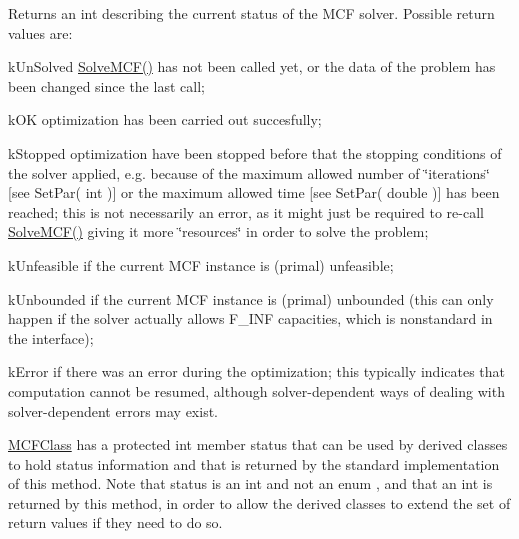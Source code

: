 Returns an int describing the current status of the M\+CF solver. Possible return values are\+:


\begin{DoxyItemize}
\item k\+Un\+Solved \mbox{\hyperlink{class_m_c_f_class_ac0d96429d896a2d878a5f057535ab1ee}{Solve\+M\+C\+F()}} has not been called yet, or the data of the problem has been changed since the last call;
\item k\+OK optimization has been carried out succesfully;
\item k\+Stopped optimization have been stopped before that the stopping conditions of the solver applied, e.\+g. because of the maximum allowed number of \char`\"{}iterations\char`\"{} \mbox{[}see Set\+Par( int )\mbox{]} or the maximum allowed time \mbox{[}see Set\+Par( double )\mbox{]} has been reached; this is not necessarily an error, as it might just be required to re-\/call \mbox{\hyperlink{class_m_c_f_class_ac0d96429d896a2d878a5f057535ab1ee}{Solve\+M\+C\+F()}} giving it more \char`\"{}resources\char`\"{} in order to solve the problem;
\item k\+Unfeasible if the current M\+CF instance is (primal) unfeasible;
\item k\+Unbounded if the current M\+CF instance is (primal) unbounded (this can only happen if the solver actually allows F\+\_\+\+I\+NF capacities, which is nonstandard in the interface);
\item k\+Error if there was an error during the optimization; this typically indicates that computation cannot be resumed, although solver-\/dependent ways of dealing with solver-\/dependent errors may exist.
\end{DoxyItemize}

\mbox{\hyperlink{class_m_c_f_class}{M\+C\+F\+Class}} has a protected {\ttfamily int} {\ttfamily member} {\ttfamily status} {\ttfamily that} can be used by derived classes to hold status information and that is returned by the standard implementation of this method. Note that {\ttfamily status} {\ttfamily is} an {\ttfamily int} {\ttfamily and} not an {\ttfamily enum} {\ttfamily }, and that an {\ttfamily int} {\ttfamily is} returned by this method, in order to allow the derived classes to extend the set of return values if they need to do so. \mbox{\label{class_m_c_f_class_a88fa193007f0bc6ef751664a9f4c75a2}} 
